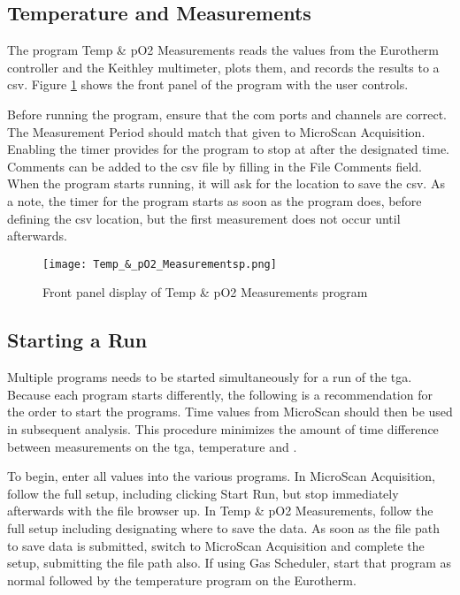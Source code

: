     \subsection{Temperature and  Measurements}
        The program Temp \& pO2 Measurements reads the values from the Eurotherm controller and the Keithley multimeter, plots them, and records the results to a \gls{csv}.
        Figure \ref{fig:temppo2measure} shows the front panel of the program with the user controls.

        Before running the program, ensure that the com ports and channels are correct.
        The Measurement Period should match that given to MicroScan Acquisition.
        Enabling the timer provides for the program to stop at after the designated time.
        Comments can be added to the \gls{csv} file by filling in the File Comments field.
        When the program starts running, it will ask for the location to save the \gls{csv}.
        As a note, the timer for the program starts as soon as the program does, before defining the \gls{csv} location, but the first measurement does not occur until afterwards.

        \begin{figure}
            \begin{center}
            \texttt{[image: Temp\_\&\_pO2\_Measurementsp.png]}
            \end{center}
            \caption{Front panel display of Temp \& pO2 Measurements program}
            \label{fig:temppo2measure}
        \end{figure}

    \subsection{Starting a Run}
        Multiple programs needs to be started simultaneously for a run of the \gls{tga}.
        Because each program starts differently, the following is a recommendation for the order to start the programs.
        Time values from MicroScan should then be used in subsequent analysis.
        This procedure minimizes the amount of time difference between measurements on the \gls{tga}, temperature and .

        To begin, enter all values into the various programs.
        In MicroScan Acquisition, follow the full setup, including clicking Start Run, but stop immediately afterwards with the file browser up.
        In Temp \& pO2 Measurements, follow the full setup including designating where to save the data.
        As soon as the file path to save data is submitted, switch to MicroScan Acquisition and complete the setup, submitting the file path also.
        If using Gas Scheduler, start that program as normal followed by the temperature program on the Eurotherm.

